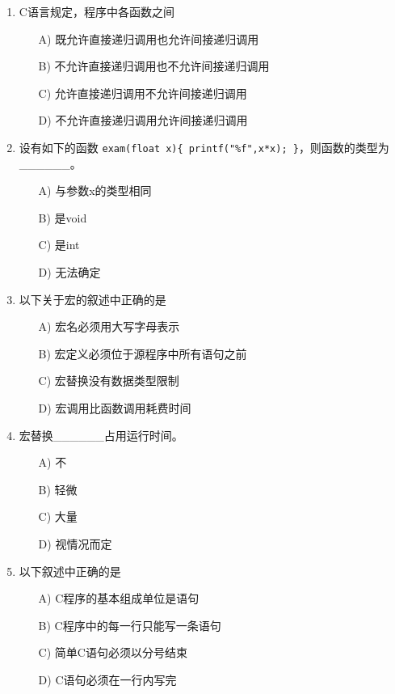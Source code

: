 \documentclass[a4paper,12pt]{article}
\begin{document}
\begin{enumerate}
	\item C语言规定，程序中各函数之间
	      \begin{enumerate}
		      \item[A)] 既允许直接递归调用也允许间接递归调用
		      \item[B)] 不允许直接递归调用也不允许间接递归调用
		      \item[C)] 允许直接递归调用不允许间接递归调用
		      \item[D)] 不允许直接递归调用允许间接递归调用
	      \end{enumerate}
	      \vspace{0.3cm}

	\item 设有如下的函数 \texttt{exam(float x)\{ printf("\%f",x*x); \}}，则函数的类型为\_\_\_\_\_\_。
	      \begin{enumerate}
		      \item[A)] 与参数x的类型相同
		      \item[B)] 是void
		      \item[C)] 是int
		      \item[D)] 无法确定
	      \end{enumerate}
	      \vspace{0.3cm}

	\item 以下关于宏的叙述中正确的是
	      \begin{enumerate}
		      \item[A)] 宏名必须用大写字母表示
		      \item[B)] 宏定义必须位于源程序中所有语句之前
		      \item[C)] 宏替换没有数据类型限制
		      \item[D)] 宏调用比函数调用耗费时间
	      \end{enumerate}
	      \vspace{0.3cm}

	\item 宏替换\_\_\_\_\_\_占用运行时间。
	      \begin{enumerate}
		      \item[A)] 不
		      \item[B)] 轻微
		      \item[C)] 大量
		      \item[D)] 视情况而定
	      \end{enumerate}
	      \vspace{0.3cm}

	\item 以下叙述中正确的是
	      \begin{enumerate}
		      \item[A)] C程序的基本组成单位是语句
		      \item[B)] C程序中的每一行只能写一条语句
		      \item[C)] 简单C语句必须以分号结束
		      \item[D)] C语句必须在一行内写完
	      \end{enumerate}
	      \vspace{0.3cm}


\end{enumerate}
\end{document}
